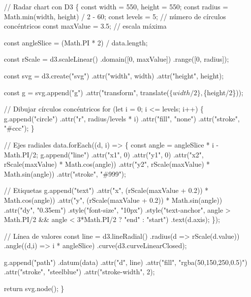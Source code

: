 \documentclass[
  spanish,
  letterpaper,
]{book}
\newenvironment{Shaded}{\begin{snugshade}}{\end{snugshade}}
\newcommand{\NormalTok}[1]{\textcolor[rgb]{0.00,0.23,0.31}{#1}}
\begin{document}
\begin{Shaded}
\begin{Highlighting}[]
\NormalTok{// Radar chart con D3}
\NormalTok{\{}
\NormalTok{  const width = 550, height = 550;}
\NormalTok{  const radius = Math.min(width, height) / 2 {-} 60;}
\NormalTok{  const levels = 5; // número de círculos concéntricos}
\NormalTok{  const maxValue = 3.5; // escala máxima}

\NormalTok{  const angleSlice = (Math.PI * 2) / data.length;}

\NormalTok{  const rScale = d3.scaleLinear()}
\NormalTok{    .domain([0, maxValue])}
\NormalTok{    .range([0, radius]);}

\NormalTok{  const svg = d3.create("svg")}
\NormalTok{    .attr("width", width)}
\NormalTok{    .attr("height", height);}

\NormalTok{  const g = svg.append("g")}
\NormalTok{    .attr("transform", \textasciigrave{}translate($\{width/2\},$\{height/2\})\textasciigrave{});}

\NormalTok{  // Dibujar círculos concéntricos}
\NormalTok{  for (let i = 0; i \textless{}= levels; i++) \{}
\NormalTok{    g.append("circle")}
\NormalTok{      .attr("r", radius/levels * i)}
\NormalTok{      .attr("fill", "none")}
\NormalTok{      .attr("stroke", "\#ccc");}
\NormalTok{  \}}

\NormalTok{  // Ejes radiales}
\NormalTok{  data.forEach((d, i) =\textgreater{} \{}
\NormalTok{    const angle = angleSlice * i {-} Math.PI/2;}
\NormalTok{    g.append("line")}
\NormalTok{      .attr("x1", 0)}
\NormalTok{      .attr("y1", 0)}
\NormalTok{      .attr("x2", rScale(maxValue) * Math.cos(angle))}
\NormalTok{      .attr("y2", rScale(maxValue) * Math.sin(angle))}
\NormalTok{      .attr("stroke", "\#999");}

\NormalTok{    // Etiquetas}
\NormalTok{    g.append("text")}
\NormalTok{      .attr("x", (rScale(maxValue + 0.2)) * Math.cos(angle))}
\NormalTok{      .attr("y", (rScale(maxValue + 0.2)) * Math.sin(angle))}
\NormalTok{      .attr("dy", "0.35em")}
\NormalTok{      .style("font{-}size", "10px")}
\NormalTok{      .style("text{-}anchor", angle \textgreater{} Math.PI/2 \&\& angle \textless{} 3*Math.PI/2 ? "end" : "start")}
\NormalTok{      .text(d.axis);}
\NormalTok{  \});}

\NormalTok{  // Línea de valores}
\NormalTok{  const line = d3.lineRadial()}
\NormalTok{    .radius(d =\textgreater{} rScale(d.value))}
\NormalTok{    .angle((d,i) =\textgreater{} i * angleSlice)}
\NormalTok{    .curve(d3.curveLinearClosed);}

\NormalTok{  g.append("path")}
\NormalTok{    .datum(data)}
\NormalTok{    .attr("d", line)}
\NormalTok{    .attr("fill", "rgba(50,150,250,0.5)")}
\NormalTok{    .attr("stroke", "steelblue")}
\NormalTok{    .attr("stroke{-}width", 2);}

\NormalTok{  return svg.node();}
\NormalTok{\}}
\end{Highlighting}
\end{Shaded}
\end{document}
